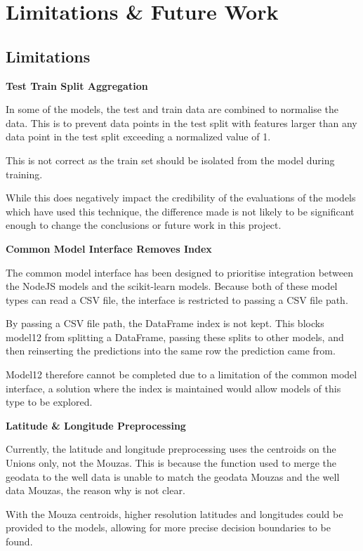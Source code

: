\chapter{Limitations \& Future Work}

\section{Limitations}

\textbf{Test Train Split Aggregation}

In some of the models, the test and train data are combined to normalise the data. This is to prevent data points in the test split with features larger than any data point in the test split exceeding a normalized value of 1. 

This is not correct as the train set should be isolated from the model during training.

While this does negatively impact the credibility of the evaluations of the models which have used this technique, the difference made is not likely to be significant enough to change the conclusions or future work in this project.

\textbf{Common Model Interface Removes Index}

The common model interface has been designed to prioritise integration between the NodeJS models and the scikit-learn models. Because both of these model types can read a CSV file, the interface is restricted to passing a CSV file path.

By passing a CSV file path, the DataFrame index is not kept. This blocks model12 from splitting a DataFrame, passing these splits to other models, and then reinserting the predictions into the same row the prediction came from.

Model12 therefore cannot be completed due to a limitation of the common model interface, a solution where the index is maintained would allow models of this type to be explored.

\textbf{Latitude \& Longitude Preprocessing}

Currently, the latitude and longitude preprocessing uses the centroids on the Unions only, not the Mouzas. This is because the function used to merge the geodata to the well data is unable to match the geodata Mouzas and the well data Mouzas, the reason why is not clear. 

With the Mouza centroids, higher resolution latitudes and longitudes could be provided to the models, allowing for more precise decision boundaries to be found.

